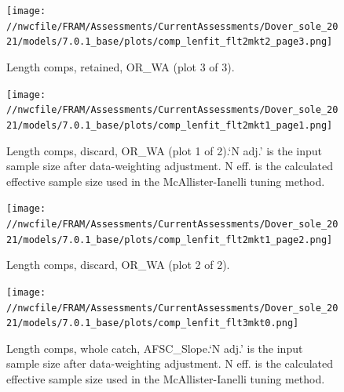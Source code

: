\documentclass[11pt,
  english,
  a4paper,
]{article}
\begin{document}
\begin{figure}
\centering
\texttt{[image: //nwcfile/FRAM/Assessments/CurrentAssessments/Dover\_sole\_2021/models/7.0.1\_base/plots/comp\_lenfit\_flt2mkt2\_page3.png]}
\caption{Length comps, retained, OR\_WA (plot 3 of 3).\label{fig:comp_lenfit_flt2mkt2_page3}}
\end{figure}

\tagmcend\tagstructend


\begin{figure}
\centering
\texttt{[image: //nwcfile/FRAM/Assessments/CurrentAssessments/Dover\_sole\_2021/models/7.0.1\_base/plots/comp\_lenfit\_flt2mkt1\_page1.png]}
\caption{Length comps, discard, OR\_WA (plot 1 of 2).`N adj.' is the input sample size after data-weighting adjustment. N eff. is the calculated effective sample size used in the McAllister-Ianelli tuning method.\label{fig:comp_lenfit_flt2mkt1_page1}}
\end{figure}

\tagmcend\tagstructend


\begin{figure}
\centering
\texttt{[image: //nwcfile/FRAM/Assessments/CurrentAssessments/Dover\_sole\_2021/models/7.0.1\_base/plots/comp\_lenfit\_flt2mkt1\_page2.png]}
\caption{Length comps, discard, OR\_WA (plot 2 of 2).\label{fig:comp_lenfit_flt2mkt1_page2}}
\end{figure}

\tagmcend\tagstructend


\begin{figure}
\centering
\texttt{[image: //nwcfile/FRAM/Assessments/CurrentAssessments/Dover\_sole\_2021/models/7.0.1\_base/plots/comp\_lenfit\_flt3mkt0.png]}
\caption{Length comps, whole catch, AFSC\_Slope.`N adj.' is the input sample size after data-weighting adjustment. N eff. is the calculated effective sample size used in the McAllister-Ianelli tuning method.\label{fig:comp_lenfit_flt3mkt0}}
\end{figure}
\end{document}
